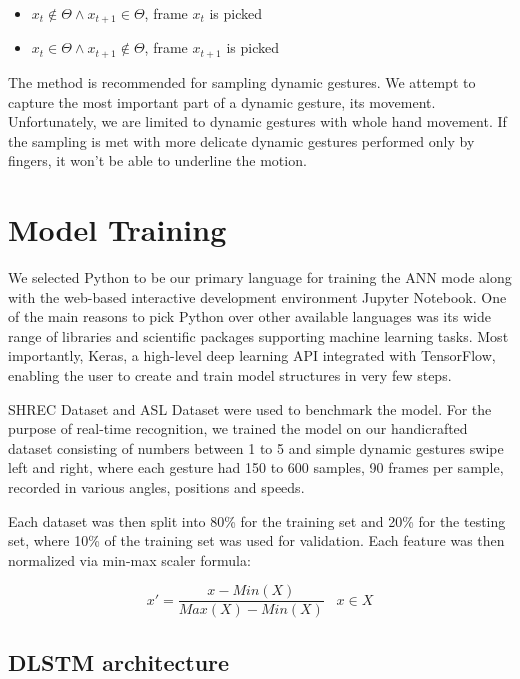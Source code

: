 \begin{enumerate}
\begin{itemize}
        \item $x_{t} \notin \Theta \land x_{t+1} \in \Theta$, frame $x_t$ is picked
        \item $x_{t} \in \Theta \land x_{t+1} \notin \Theta$, frame $x_{t+1}$ is picked
    \end{itemize}
    
    The method is recommended for sampling dynamic gestures. We attempt to capture the most important part of a dynamic gesture, its movement. Unfortunately, we are limited to dynamic gestures with whole hand movement. If the sampling is met with more delicate dynamic gestures performed only by fingers, it won't be able to underline the motion.
\end{enumerate}


\section{Model Training}
\label{sec:model_training}

We selected Python to be our primary language for training the ANN mode along with the web-based interactive development environment Jupyter Notebook. One of the main reasons to pick Python over other available languages was its wide range of libraries and scientific packages supporting machine learning tasks. Most importantly, Keras, a high-level deep learning API integrated with TensorFlow, enabling the user to create and train model structures in very few steps.

SHREC Dataset and ASL Dataset were used to benchmark the model. For the purpose of real-time recognition, we trained the model on our handicrafted dataset consisting of numbers between 1 to 5 and simple dynamic gestures swipe left and right, where each gesture had 150 to 600 samples, 90 frames per sample, recorded in various angles, positions and speeds. 

Each dataset was then split into 80\% for the training set and 20\% for the testing set, where 10\% of the training set was used for validation. Each feature was then normalized via min-max scaler formula:

\begin{equation}
    { x' = \frac{x - Min(X)}{Max(X)-Min(X)}\;\;\; x \in X}
\end{equation}

\subsection{DLSTM architecture}

